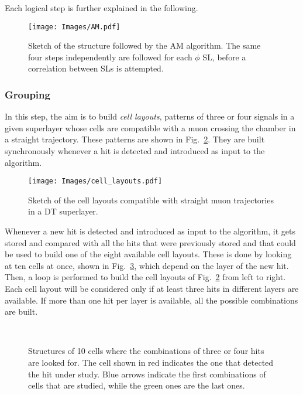 \documentclass[../main.tex]{subfiles}
\begin{document}
Each logical step is further explained in the following.





\begin{figure}[h!]
\begin{center}
\texttt{[image: Images/AM.pdf]}
\end{center}
\caption{Sketch of the structure followed by the AM algorithm. The same four steps independently are followed for each $\phi$ SL, before a correlation between SLs is attempted.}
\label{dts:fig:am}
\end{figure}


\subsubsection*{Grouping}

In this step, the aim is to build \textit{cell layouts}, patterns of three or four signals in a given superlayer whose cells are compatible with a muon crossing the chamber in a straight trajectory. These patterns are shown in Fig.~\ref{dts:fig:cell_layouts}. They are built synchronously whenever a hit is detected and introduced as input to the algorithm.

\begin{figure}[h!]
\begin{center}
\texttt{[image: Images/cell\_layouts.pdf]}
\end{center}
\caption{Sketch of the cell layouts compatible with straight muon trajectories in a DT superlayer.}
\label{dts:fig:cell_layouts}
\end{figure}

Whenever a new hit is detected and introduced as input to the algorithm, it gets stored and compared with all the hits that were previously stored and that could be used to build one of the eight available cell layouts. These is done by looking at ten cells at once, shown in Fig.~\ref{dts:fig:triangle}, which depend on the layer of the new hit. Then, a loop is performed to build the cell layouts of Fig.~\ref{dts:fig:cell_layouts} from left to right. Each cell layout will be considered only if at least three hits in different layers are available. If more than one hit per layer is available, all the possible combinations are built.

\begin{figure}[h!]
\begin{center}
\\
\end{center}
\caption{Structures of 10 cells where the combinations of three or four hits are looked for. The cell shown in red indicates the one that detected the hit under study. Blue arrows indicate the first combinations of cells that are studied, while the green ones are the last ones.}
\label{dts:fig:triangle}
\end{figure}
\end{document}
